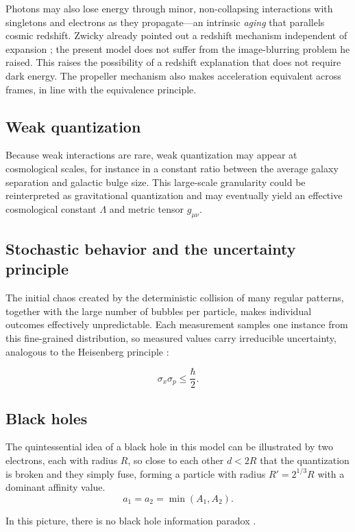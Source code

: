\documentclass{ijuc}
\begin{document}
Photons may also lose energy through minor, non-collapsing interactions with singletons and electrons as they propagate—an intrinsic \textit{aging} that parallels cosmic redshift. Zwicky already pointed out a redshift mechanism independent of expansion \cite{zwicky1929redshift}; the present model does not suffer from the image-blurring problem he raised. This raises the possibility of a redshift explanation that does not require dark energy. The propeller mechanism also makes acceleration equivalent across frames, in line with the equivalence principle.

\subsection{Weak quantization}
Because weak interactions are rare, weak quantization may appear at cosmological scales, for instance in a constant ratio between the average galaxy separation and galactic bulge size. This large-scale granularity could be reinterpreted as gravitational quantization and may eventually yield an effective cosmological constant $\Lambda$ and metric tensor $g_{\mu\nu}$.

\subsection{Stochastic behavior and the uncertainty principle}

The initial chaos created by the deterministic collision of many regular patterns, together with the large number of bubbles per particle, makes individual outcomes effectively unpredictable. Each measurement samples one instance from this fine-grained distribution, so measured values carry irreducible uncertainty, analogous to the Heisenberg principle \cite{Heisenberg1927}:

\[
\sigma_x \sigma_p \leq \frac{\hbar}{2}.
\]

\subsection{Black holes}
The quintessential idea of a black hole in this model can be illustrated by two electrons, each with radius $R$, so close to each other $d<2R$ that the quantization is broken and they simply fuse, forming a particle with radius $R'=2^{1/3}R$ with a dominant affinity value. 
\[
a_1 = a_2 = \min(A_1,A_2).
\]

In this picture, there is no black hole information paradox \cite{hawking1976breakdown,harlow2016jerusalem}.
\end{document}
